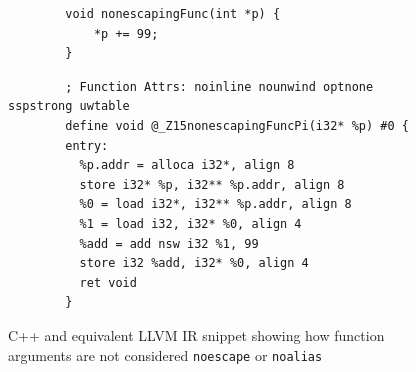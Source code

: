 \documentclass{mpaper}
\begin{document}
    \begin{figure}
        \centering
        \begin{verbatim}
        void nonescapingFunc(int *p) {
            *p += 99;
        }
        \end{verbatim}
        \begin{verbatim}
        ; Function Attrs: noinline nounwind optnone sspstrong uwtable
        define void @_Z15nonescapingFuncPi(i32* %p) #0 {
        entry:
          %p.addr = alloca i32*, align 8
          store i32* %p, i32** %p.addr, align 8
          %0 = load i32*, i32** %p.addr, align 8
          %1 = load i32, i32* %0, align 4
          %add = add nsw i32 %1, 99
          store i32 %add, i32* %0, align 4
          ret void
        }
        \end{verbatim}
        \caption{C++ and equivalent LLVM IR snippet showing how function arguments are not considered \texttt{noescape} or \texttt{noalias}}
        \label{fig:function-arguments}
    \end{figure}
    
\end{document}
